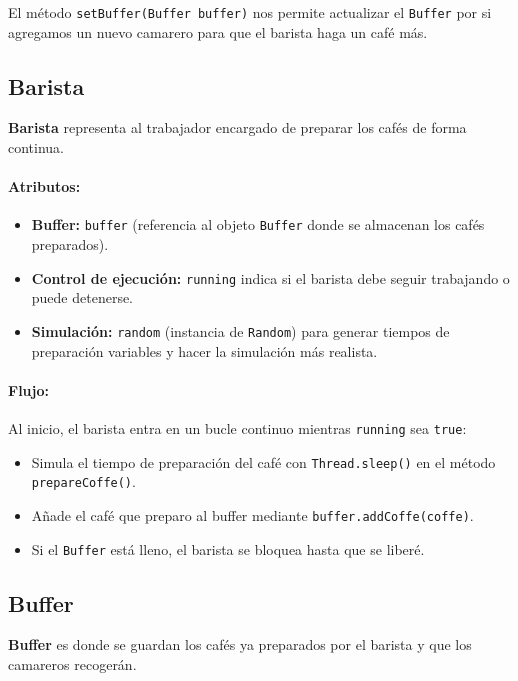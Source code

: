 \documentclass[a4paper,12pt]{report}
\begin{document}
\noindent El método \texttt{setBuffer(Buffer buffer)} nos permite actualizar el \texttt{Buffer} por si agregamos un nuevo camarero para que el barista haga un café más.

\vspace{1em}
\subsection*{Barista}
\noindent \textbf{Barista} representa al trabajador encargado de preparar los cafés de forma continua.

\paragraph{Atributos:}
\begin{itemize}
  \item \textbf{Buffer:} \texttt{buffer} (referencia al objeto \texttt{Buffer} donde se almacenan los cafés preparados).
  \item \textbf{Control de ejecución:} \texttt{running} indica si el barista debe seguir trabajando o puede detenerse.
  \item \textbf{Simulación:} \texttt{random} (instancia de \texttt{Random}) para generar tiempos de preparación variables y hacer la simulación más realista.
\end{itemize}

\paragraph{Flujo:}
Al inicio, el barista entra en un bucle continuo mientras \texttt{running} sea \texttt{true}:
\begin{itemize}
  \item Simula el tiempo de preparación del café con \texttt{Thread.sleep()} en el método \texttt{prepareCoffe()}.
  \item Añade el café que preparo al buffer mediante \texttt{buffer.addCoffe(coffe)}.
  \item Si el \texttt{Buffer} está lleno, el barista se bloquea hasta que se liberé.
\end{itemize}

\vspace{1em}
\subsection*{Buffer}
\noindent \textbf{Buffer} es donde se guardan los cafés ya preparados por el barista y que los camareros recogerán.
\end{document}
